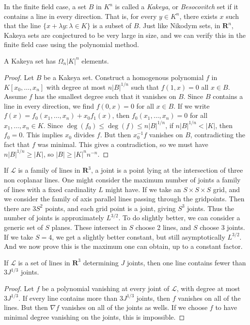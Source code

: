 In the finite field case, a set $B$ in $K^n$ is called a {\it Kakeya}, or {\it Besocovitch} set if it contains a line in every direction. That is, for every $y \in K^n$, there exists $x$ such that the line $\{ x + \lambda y : \lambda \in K \}$ is a subset of $B$. Just like Nikodym sets, in $\mathbf{R}^n$, Kakeya sets are conjectured to be very large in size, and we can verify this in the finite field case using the polynomial method.

\begin{theorem}
	A Kakeya set has $\Omega_n |K|^n$ elements.
\end{theorem}
\begin{proof}
	Let $B$ be a Kakeya set. Construct a homogenous polynomial $f$ in $K[x_0, \dots, x_n]$ with degree at most $n |B|^{1/n}$ such that $f(1,x) = 0$ all $x \in B$. Assume $f$ has the smallest degree such that it vanishes on $B$. Since $B$ contains a line in every direction, we find $f(0,x) = 0$ for all $x \in B$. If we write $f(x) = f_0(x_1, \dots, x_n) + x_0 f_1(x)$, then $f_0(x_1, \dots, x_n) = 0$ for all $x_1, \dots, x_n \in K$. Since $\deg(f_0) \leq \deg(f) \leq n |B|^{1/n}$, if $n |B|^{1/n} < |K|$, then $f_0 = 0$. This implies $x_0$ divides $f$. But then $x_0^{-1} f$ vanishes on $B$, contradicting the fact that $f$ was minimal. This gives a contradiction, so we must have $n |B|^{1/n} \geq |K|$, so $|B| \geq |K|^n n^{-n}$.
\end{proof}

If $\mathcal{L}$ is a family of lines in $\mathbf{R}^3$, a joint is a point lying at the intersection of three non coplanar lines. One might consider the maximum number of joints a family of lines with a fixed cardinality $L$ might have. If we take an $S \times S \times S$ grid, and we consider the family of axis parallel lines passing through the gridpoints. Then there are $3S^2$ points, and each grid point is a joint, giving $S^3$ joints. Thus the number of joints is approximately $L^{3/2}$. To do slightly better, we can consider a generic set of $S$ planes. These intersect in $S$ choose 2 lines, and $S$ choose 3 joints. If we take $S = 4$, we get a slightly better constant, but still asymptotically $L^{3/2}$. And we now prove this is the maximum one can obtain, up to a constant factor.

\begin{lemma}
	If $\mathcal{L}$ is a set of lines in $\mathbf{R}^3$ determining $J$ joints, then one line contains fewer than $3J^{1/3}$ joints. 
\end{lemma}
\begin{proof}
	Let $f$ be a polynomial vanishing at every joint of $\mathcal{L}$, with degree at most $3J^{1/3}$. If every line contains more than $3J^{1/3}$ joints, then $f$ vanishes on all of the lines. But then $\nabla f$ vanishes on all of the joints as wells. If we choose $f$ to have minimal degree vanishing on the joints, this is impossible.
\end{proof}

